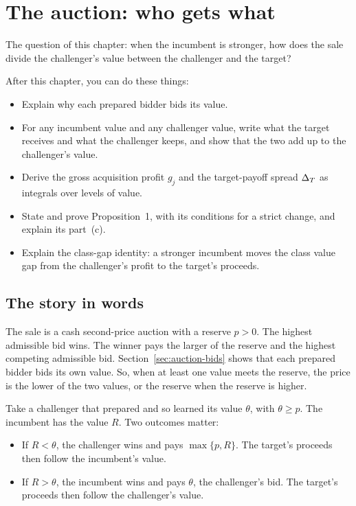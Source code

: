 \chapter{The auction: who gets what}\label{ch:auction}

\begin{chapterplan}
The question of this chapter: when the incumbent is stronger, how does the sale divide the challenger's value
between the challenger and the target?

After this chapter, you can do these things:
\begin{itemize}
\item Explain why each prepared bidder bids its value.
\item For any incumbent value and any challenger value, write what the target receives and what the challenger
keeps, and show that the two add up to the challenger's value.
\item Derive the gross acquisition profit \(g_j\) and the target-payoff spread \(\Delta_T\) as integrals over levels
of value.
\item State and prove Proposition~1, with its conditions for a strict change, and explain its part~(c).
\item Explain the class-gap identity: a stronger incumbent moves the class value gap from the challenger's profit
to the target's proceeds.
\end{itemize}
\end{chapterplan}

\section{The story in words}\label{sec:auction-story}

The sale is a cash second-price auction with a reserve \(p>0\). The highest admissible bid wins. The winner pays
the larger of the reserve and the highest competing admissible bid. Section~\ref{sec:auction-bids} shows that
each prepared bidder bids its own value. So, when at least one value meets the reserve, the price is the lower of
the two values, or the reserve when the reserve is higher.

Take a challenger that prepared and so learned its value \(\theta\), with \(\theta\ge p\). The incumbent has the
value \(R\). Two outcomes matter:
\begin{itemize}
\item If \(R<\theta\), the challenger wins and pays \(\max\{p,R\}\). The target's proceeds then follow the
incumbent's value.
\item If \(R>\theta\), the incumbent wins and pays \(\theta\), the challenger's bid. The target's proceeds then
follow the challenger's value.
\end{itemize}

